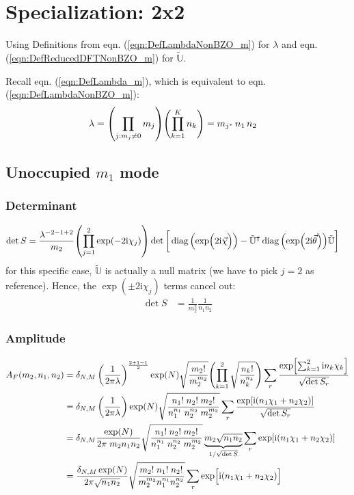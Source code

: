 \documentclass[
	english,
	a4paper,
	fontsize=10pt,
	parskip=half,
	titlepage=true,
	DIV=12,
	final
]{scrreprt}
\newcommand*{\transp}{\ensuremath{^\intercal}}
\newcommand*{\iunit}{\ensuremath{\mathrm{i}}}
\DeclareMathOperator{\diag}{diag}
\begin{document}
\section{Specialization: 2x2}
Using Definitions from eqn. (\ref{eqn:DefLambdaNonBZO_m}) for $\lambda$ and eqn. (\ref{eqn:DefReducedDFTNonBZO_m}) for $\tilde{\mathbb{U}}$.

Recall eqn. (\ref{eqn:DefLambda_m}), which is equivalent to eqn. (\ref{eqn:DefLambdaNonBZO_m}):
\begin{align*}
	\lambda
&=
	\qty( \prod_{j : m_j \neq 0} m_j )
	\qty( \prod_{k=1}^{K}   n_k )
=
	m_{j^*} \, n_1 \, n_2
\end{align*}

\subsection{Unoccupied $m_1$ mode}
\subsubsection{Determinant}
\begin{align}
	\det S
&=
	\frac{ \lambda^{-2 - 1 + 2} }{ m_2 }
	\qty( \prod_{j=1}^{2} \exp(-2\iunit \chi_j) )
	\det\qty[\bigg.
		\diag\qty(\exp(\Big.2\iunit\vec{\chi}))
		-
		\tilde{\mathbb{U}}\transp
		\diag\qty(\exp(2\iunit\vec{\theta}))
		\tilde{\mathbb{U}}
	]
\end{align}
for this specific case, $\tilde{\mathbb{U}}$ is actually a null matrix (we have to pick $j=2$ as reference). Hence, the 
$\exp(\pm 2\iunit \chi_j)$ terms cancel out:
\begin{align}
	\det S
&=
	\frac{1}{m_2^{2}}
	\frac{1}{n_1 n_2}
\end{align}

\subsubsection{Amplitude}
\begin{align}
	A_F(m_2, n_1, n_2)
&=
	\delta_{N,M} \, \qty(
		\frac{1}{2\pi\lambda}
	)^{\frac{2 + 1 - 1}{2}}
	\exp(N)
		\sqrt{\frac
			{ m_2! }
			{ m_2^{m_2} }
	}
	\qty( \prod_{k=1}^{2}
		\sqrt{\frac
			{ n_k! }
			{ n_k^{n_k} }
	})
	\sum_r
		\frac
		{\exp[ \sum_{k=1}^{2} \iunit n_k \chi_k]}
		{\sqrt{\det S_r}} \\
&=
	\delta_{N,M} \, \qty(
		\frac{1}{2\pi\lambda}
	)
	\exp(N)
		\sqrt{\frac
			{ n_1! \; n_2! \; m_2! }
			{ n_1^{n_1} \; n_2^{n_2} \; m_2^{m_2}}
	}
	\sum_r
		\frac
		{\exp[
			\iunit ( n_1 \chi_1 + n_2 \chi_2 )
		]}
		{\sqrt{\det S_r}}
	\\
&=
	\delta_{N,M}
	\frac
		{\exp(N)}
		{2\pi \; m_2 n_1 n_2}
	\sqrt{\frac
		{ n_1! \; n_2! \; m_2! }
		{ n_1^{n_1} \; n_2^{n_2} \; m_2^{m_2}}
	}
	\underbrace{m_2\sqrt{n_1 n_2}}_{1/\sqrt{\det S}}
	\sum_r
		\exp[
			\iunit ( n_1 \chi_1 + n_2 \chi_2 )
		] \\
&=
	\frac
		{ \delta_{N,M} \exp(N) }
		{ 2\pi \sqrt{n_1 n_2} }
	\sqrt{\frac
		{ m_2! \; n_1! \; n_2! }
		{ m_2^{m_2} n_1^{n_1} n_2^{n_2} }
	}
	\sum_r
		\exp[ \Big.
			\iunit \qty(  
			n_1 \chi_1 + n_2 \chi_2)
		]
\end{align}
\end{document}
